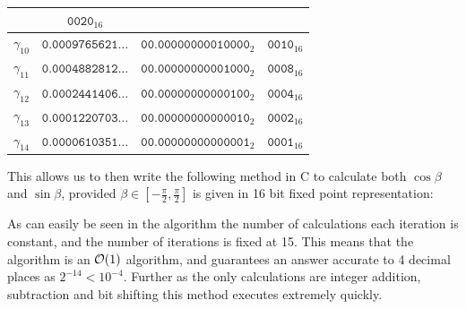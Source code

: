 {\begin{center}
\begin{tabular}{|c|c|c|c|}
		& \(\texttt{0020}_{16}\)\\\hline
	\(\gamma_{10}\) & \(\texttt{0.0009765621}\ldots\)
		& \(\texttt{00.00000000010000}_2\)
		& \(\texttt{0010}_{16}\)\\\hline
	\(\gamma_{11}\) & \(\texttt{0.0004882812}\ldots\)
		& \(\texttt{00.00000000001000}_2\)
		& \(\texttt{0008}_{16}\)\\\hline
	\(\gamma_{12}\) & \(\texttt{0.0002441406}\ldots\)
		& \(\texttt{00.00000000000100}_2\)
		& \(\texttt{0004}_{16}\)\\\hline
	\(\gamma_{13}\) & \(\texttt{0.0001220703}\ldots\)
		& \(\texttt{00.00000000000010}_2\)
		& \(\texttt{0002}_{16}\)\\\hline
	\(\gamma_{14}\) & \(\texttt{0.0000610351}\ldots\)
		& \(\texttt{00.00000000000001}_2\)
		& \(\texttt{0001}_{16}\)\\\hline
\end{tabular}
\end{center}

This allows us to then write the following method in C to calculate both \(\cos\beta\) and \(\sin\beta\), provided \(\beta \in [-\tfrac{\pi}{2}, \tfrac{\pi}{2}]\) is given in 16 bit fixed point representation:


As can easily be seen in the algorithm the number of calculations each iteration is constant, and the number of iterations is fixed at 15. This means that the algorithm is an \(\mathcal{O}(1)\) algorithm, and guarantees an answer accurate to 4 decimal places as \(2^{-14} < 10^{-4}\). Further as the only calculations are integer addition, subtraction and bit shifting this method executes extremely quickly.\\

}
